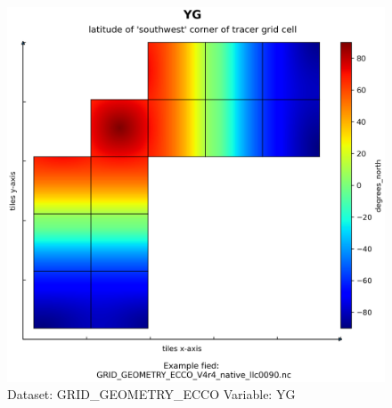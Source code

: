 \begin{figure}[H]
\centering
\includegraphics[width=\textwidth]{../images/plots/native_plots_coords/Geometry_Parameters_for_the_Lat-Lon-Cap_90_(llc90)_Native_Model_Grid_(Version_4_Release_4)/YG.png}
\caption{Dataset: GRID\_GEOMETRY\_ECCO Variable: YG}
\label{tab:table-GRID_GEOMETRY_ECCO_YG-Plot}
\end{figure}
\pagebreak
